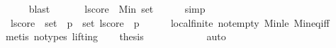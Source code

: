 \begin{isabellebody}
\ \ \ \ \isamarkupfalse%
\ blast\isanewline
\ \ \isanewline
\ \ \isamarkupfalse%
\ {\isachardoublequoteopen}{\isacharquery}{\kern0pt}lscore\ {\isacharequal}{\kern0pt}\ Min\ {\isacharquery}{\kern0pt}set{\isachardoublequoteclose}\isanewline
\ \ \ \ \isamarkupfalse%
\ simp\isanewline
\ \ \isamarkupfalse%
\ {}{\isacharcolon}{\kern0pt}\ {\isachardoublequoteopen}{\isacharquery}{\kern0pt}lscore\ {\isasymin}\ {\isacharquery}{\kern0pt}set\ {\isasymand}\ {\isacharparenleft}{\kern0pt}{\isasymforall}p\ {\isasymin}\ {\isacharquery}{\kern0pt}set{\isachardot}{\kern0pt}\ {\isacharquery}{\kern0pt}lscore\ {\isasymle}\ p{\isacharparenright}{\kern0pt}{\isachardoublequoteclose}\isanewline
\ \ \ \ \isamarkupfalse%
\ local{\isachardot}{\kern0pt}finite\ not{\isacharunderscore}{\kern0pt}empty\ Min{\isacharunderscore}{\kern0pt}le\ Min{\isacharunderscore}{\kern0pt}eq{\isacharunderscore}{\kern0pt}iff\isanewline
\ \ \ \ \isamarkupfalse%
\ {\isacharparenleft}{\kern0pt}metis\ {\isacharparenleft}{\kern0pt}no{\isacharunderscore}{\kern0pt}types{\isacharcomma}{\kern0pt}\ lifting{\isacharparenright}{\kern0pt}{\isacharparenright}{\kern0pt}\isanewline
\ \ \isamarkupfalse%
\ {\isacharquery}{\kern0pt}thesis\isanewline
\ \ \ \ \isamarkupfalse%
\ {\isachardoublequoteopen}{}{\isachardoublequoteclose}\isanewline
\ \ \ \ \isamarkupfalse%
\ auto\isanewline
{}\isamarkupfalse%
%
\endisatagproof
{\isafoldproof}%
%
\isadelimproof
\isanewline
%
\endisadelimproof
%
\isadelimtheory
\isanewline
%
\endisadelimtheory
%
\isatagtheory
{}\isamarkupfalse%
%
\endisatagtheory
{\isafoldtheory}%
%
\isadelimtheory
%
\endisadelimtheory
%
\end{isabellebody}%
\endinput
